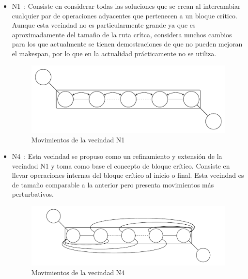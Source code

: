 \begin{itemize}
\item N1~\cite{blazewicz1996job}: Consiste en considerar todas las soluciones que se crean al intercambiar cualquier par de operaciones adyacentes que pertenecen 
a un bloque crítico. Aunque esta vecindad no es particularmente grande ya que es aproximadamente del tamaño de la ruta crítca, considera muchos cambios para los que 
actualmente se tienen demostraciones de que no pueden mejoran el makespan, por lo que en la actualidad prácticamente no se utiliza.
\begin{figure}[H]
\centering
\includegraphics[scale=.7]{Imagenes/N1.pdf}
\caption{Movimientos de la vecindad N1}
\end{figure}

\item N4~\cite{dell1993applying}: Esta vecindad se propuso como un refinamiento y extensión de la vecindad N1 y toma como base el concepto de bloque crítico. 
%
Consiste en llevar operaciones internas del bloque crítico al inicio o final. 
%
Esta vecindad es de tamaño comparable a la anterior pero presenta movimientos más perturbativos.
\begin{figure}[H]
\centering
\includegraphics[scale=.7]{Imagenes/N4.pdf}
\caption{Movimientos de la vecindad N4}
\end{figure}



\end{itemize}
